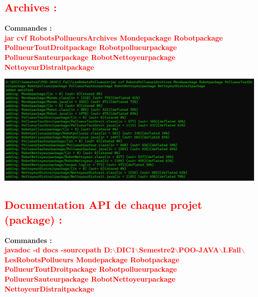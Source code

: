 \documentclass{article}
\begin{document}
\textcolor{red}{\section*{Archives :}}
\textbf{\large{Commandes : }}\\
\textcolor{red}{\textbf{jar cvf RobotsPollueursArchives Mondepackage Robotpackage PollueurToutDroitpackage Robotpollueurpackage PollueurSauteurpackage RobotNettoyeurpackage NettoyeurDistraitpackage}}

\includegraphics[scale=0.4]{../images/archive.png}\\

\textcolor{red}{\section*{Documentation	API	de	chaque	projet	(package) :}}
\textbf{\large{Commandes : }}\\
\textcolor{red}{\textbf{javadoc -d docs -sourcepath D:$\backslash$DIC1$\backslash$Semestre2$\backslash$POO-JAVA$\backslash$I.Fall$\backslash$LesRobotsPollueurs Mondepackage Robotpackage PollueurToutDroitpackage Robotpollueurpackage PollueurSauteurpackage RobotNettoyeurpackage NettoyeurDistraitpackage}}
\end{document}

